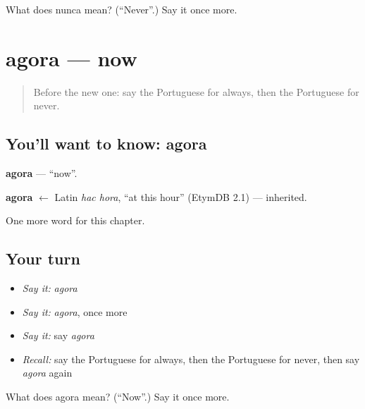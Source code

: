 \begin{tcolorbox}[breakable,colback=teal!4,colframe=teal!35!black,title={Before you move on}]
What does nunca mean? (\textquotedblleft{}Never\textquotedblright{}.) Say it once more.
\end{tcolorbox}
\section[agora]{agora — now}

\label{lesson:PT-C71-agora}



\begin{quote}
Before the new one: say the Portuguese for always, then the Portuguese for never.
\end{quote}

\subsection*{You'll want to know: agora}
\textbf{agora} — \textquotedblleft{}now\textquotedblright{}.

\begin{cousinweb}
\textbf{agora} $\leftarrow$ Latin \emph{hac hora}, \textquotedblleft{}at this hour\textquotedblright{} (EtymDB 2.1) — inherited.
\end{cousinweb}

\begin{grammarlens}[title={What you've built}]
One more word for this chapter.
\end{grammarlens}

\subsection*{Your turn}
\begin{itemize}
\raggedright
  \item \emph{Say it:} \emph{agora}
  \item \emph{Say it:} \emph{agora}, once more
  \item \emph{Say it:} say \emph{agora}
  \item \emph{Recall:} say the Portuguese for always, then the Portuguese for never, then say \emph{agora} again
\end{itemize}

\begin{tcolorbox}[breakable,colback=teal!4,colframe=teal!35!black,title={Before you move on}]
What does agora mean? (\textquotedblleft{}Now\textquotedblright{}.) Say it once more.
\end{tcolorbox}

